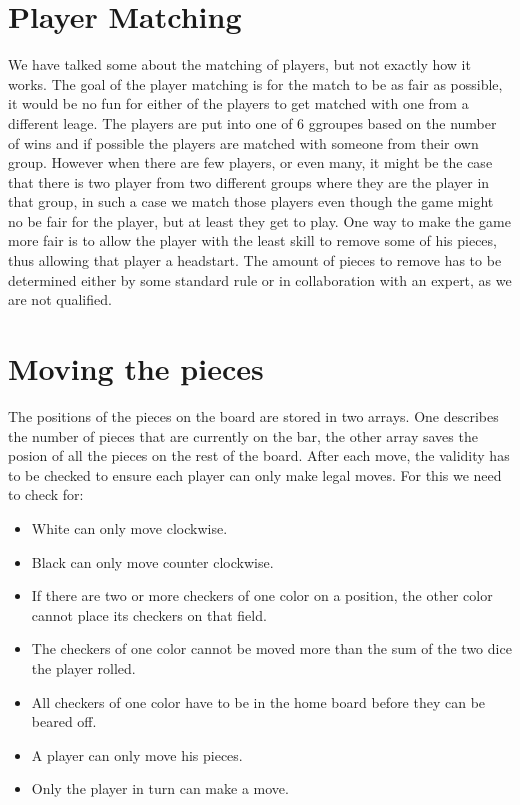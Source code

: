 \documentclass[ twoside,openright,titlepage,numbers=noenddot,headinclude,%
                footinclude=true,cleardoublepage=empty,abstractoff, %
                BCOR=5mm,paper=a4,fontsize=11pt,%
                ngerman,american,%
                ]{scrreprt}
\begin{document}
\section{Player Matching}
We have talked some about the matching of players, but not exactly how it works. The goal of the player matching is for the match to be as fair as possible, it would be no fun for either of the players to get matched with one from a different leage. The players are put into one of 6 ggroupes based on the number of wins and if possible the players are matched with someone from their own group. However when there are few players, or even many, it might be the case that there is two player from two different groups where they are the player in that group, in such a case we match those players even though the game might no be fair for the player, but  at least they get to play. One way to make the game more fair is to allow the player with the least skill to remove some of his pieces, thus allowing that player a headstart. The amount of pieces to remove has to be determined either by some standard rule or in collaboration with an expert, as we are not qualified.


\section{Moving the pieces}
The positions of the pieces on the board are stored in two arrays. One describes the number of pieces that are currently on the bar, the other array saves the posion of all the pieces on the rest of the board. 
After each move, the validity has to be checked to ensure each player can only make legal moves. 
For this we need to check for:
\begin{itemize}
  \item White can only move clockwise.
  \item Black can only move counter clockwise.
  \item If there are two or more checkers of one color on a position, the other color cannot place its checkers on that field. 
  \item The checkers of one color cannot be moved more than the sum of the two dice the player rolled.
  \item All checkers of one color have to be in the home board before they can be beared off. 
  \item A player can only move his pieces.
  \item Only the player in turn can make a move.
\end{itemize}
\end{document}

